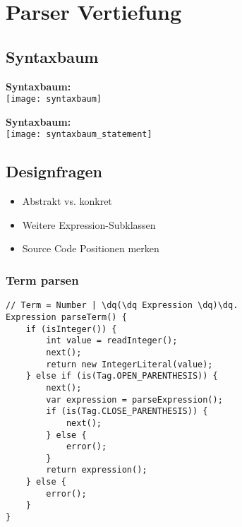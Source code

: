
\section{Parser Vertiefung}
\subsection{Syntaxbaum}
\begin{minipage}{0,5\linewidth}
    \textbf{Syntaxbaum:}\\
    \texttt{[image: syntaxbaum]}
\end{minipage}
\begin{minipage}{0,5\linewidth}
    \textbf{Syntaxbaum:}\\
    \texttt{[image: syntaxbaum\_statement]}
\end{minipage}

\subsection{Designfragen}
\begin{itemize}[topsep=0pt]
    \itemsep -0.2em
    \item Abstrakt vs. konkret
    \item Weitere Expression-Subklassen
    \item Source Code Positionen merken
\end{itemize}

\subsubsection{Term parsen}
\begin{lstlisting}
// Term = Number | \dq(\dq Expression \dq)\dq.
Expression parseTerm() {
    if (isInteger()) {
        int value = readInteger();
        next();
        return new IntegerLiteral(value);
    } else if (is(Tag.OPEN_PARENTHESIS)) {
        next();
        var expression = parseExpression();
        if (is(Tag.CLOSE_PARENTHESIS)) {
            next();
        } else {
            error();
        }
        return expression();
    } else {
        error();
    }
}
\end{lstlisting}


